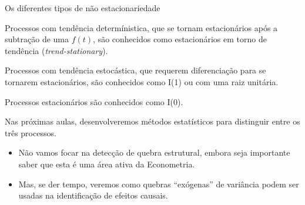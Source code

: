 \documentclass[11pt]{beamer}
\newenvironment{halfwideitemize}{\itemize\addtolength{\itemsep}{0.5em}}{\enditemize}
\begin{document}
\begin{frame}{Os diferentes tipos de não estacionariedade}
	\begin{halfwideitemize}
		\item Processos com tendência determínistica, que se tornam estacionários após a subtração de uma $f(t)$, são conhecidos como estacionários em torno de tendência ({\color{blue}\textit{trend-stationary}}). 
					\item Processos com {\color{blue}tendência estocástica, que requerem diferenciação para se tornarem estacionários}, são conhecidos como {\color{blue}I(1) ou com uma raiz unitária}.
		\item Processos {\color{blue}estacionários} são conhecidos como {\color{blue}I(0)}.
		\item Nas próximas aulas, desenvolveremos métodos estatísticos para distinguir entre os três processos.
		\begin{itemize}
			\item Não vamos focar na detecção de quebra estrutural, embora seja importante saber que esta é uma área ativa da Econometria.
			\item Mas, se der tempo, veremos como quebras ``exógenas'' de variância podem ser usadas na identificação de efeitos causais.
		\end{itemize} 
	\end{halfwideitemize}

\end{frame}

\end{document}
